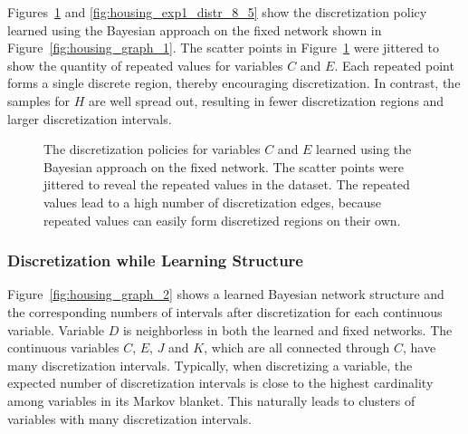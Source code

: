\begin{table}
  \centering
  \caption{
    Discretization policy summary of the Housing dataset based on the fixed network structure shown.
    The first twelve rows show the numbers of discretization intervals and the last row is the mean cross-validated log-likelihood.%
  }
  
  \label{table:housing_disc_table_1}
\end{table}

Figures~\ref{fig:housing_exp1_distr_3_5} and \ref{fig:housing_exp1_distr_8_5} show the discretization policy learned using the Bayesian approach on the fixed network shown in Figure~\ref{fig:housing_graph_1}.
The scatter points in Figure~\ref{fig:housing_exp1_distr_3_5} were jittered to show the quantity of repeated values for variables $C$ and $E$.
Each repeated point forms a single discrete region, thereby encouraging discretization.
In contrast, the samples for $H$ are well spread out, resulting in fewer discretization regions and larger discretization intervals.

\begin{figure}[ht]
  \centering
  
  \caption{
    The discretization policies for variables $C$ and $E$ learned using the Bayesian approach on the fixed network.
    The scatter points were jittered to reveal the repeated values in the dataset.
    The repeated values lead to a high number of discretization edges, because repeated values can easily form discretized regions on their own.
  }
  \label{fig:housing_exp1_distr_3_5}
\end{figure}

\subsubsection{Discretization while Learning Structure}
\label{subsubsec:housing_exp2}

Figure~\ref{fig:housing_graph_2} shows a learned Bayesian network structure and the corresponding numbers of intervals after discretization for each continuous variable.
Variable $D$ is neighborless in both the learned and fixed networks.
The continuous variables $C$, $E$, $J$ and $K$, which are all connected through $C$, have many discretization intervals.
Typically, when discretizing a variable, the expected number of discretization intervals is close to the highest cardinality among variables in its Markov blanket.
This naturally leads to clusters of variables with many discretization intervals.

